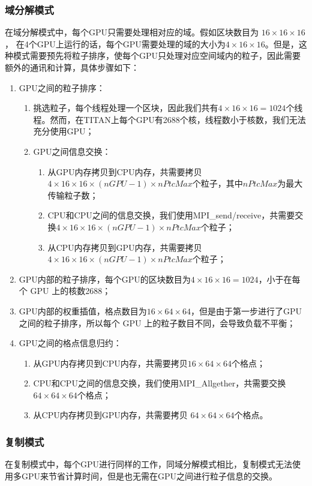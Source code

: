 \subsubsection{域分解模式}
在域分解模式中，每个GPU只需要处理相对应的域。假如区块数目为 $16 \times 16 \times 16$， 在4个GPU上运行的话，每个GPU需要处理的域的大小为$4 \times 16 \times 16$。但是，这种模式需要预先将粒子排序，使每个GPU只处理对应空间域内的粒子，因此需要额外的通讯和计算，具体步骤如下：
\begin{enumerate}
  \item GPU之间的粒子排序：
  \begin{enumerate}
    \item 挑选粒子，每个线程处理一个区块，因此我们共有$4 \times 16 \times 16 = 1024$个线程。然而，在TITAN上每个GPU有2688个核，线程数小于核数，我们无法充分使用GPU；
    \item GPU之间信息交换：
    \begin{enumerate}
      \item 从GPU内存拷贝到CPU内存，共需要拷贝$4 \times 16 \times 16\times(nGPU-1) \times nPtcMax$个粒子，其中$nPtcMax$为最大传输粒子数；
      \item CPU和CPU之间的信息交换，我们使用MPI\_send/receive，共需要交换$4 \times 16 \times 16 \times (nGPU-1) \times nPtcMax$个粒子；
      \item 从CPU内存拷贝到GPU内存，共需要拷贝$4 \times 16 \times 16 \times (nGPU-1) \times nPtcMax$个粒子；
    \end{enumerate}
  \end{enumerate}
  \item GPU内部的粒子排序，每个GPU的区块数目为$4 \times 16 \times 16=1024$，小于在每个 GPU 上的核数2688；
  \item GPU内部的权重插值，格点数目为$16 \times 64 \times 64$，但是由于第一步进行了GPU之间的粒子排序，所以每个 GPU 上的粒子数目不同，会导致负载不平衡；
  \item GPU之间的格点信息归约：
  \begin{enumerate}
    \item 从GPU内存拷贝到CPU内存，共需要拷贝$16 \times 64 \times 64$个格点；
    \item CPU和CPU之间的信息交换，我们使用MPI\_Allgether，共需要交换$64 \times 64 \times 64$个格点；
    \item 从CPU内存拷贝到GPU内存，共需要拷贝 $64 \times 64 \times 64$个格点。
  \end{enumerate}
\end{enumerate}

\subsubsection{复制模式}
在复制模式中，每个GPU进行同样的工作，同域分解模式相比，复制模式无法使用多GPU来节省计算时间，但是也无需在GPU之间进行粒子信息的交换。

